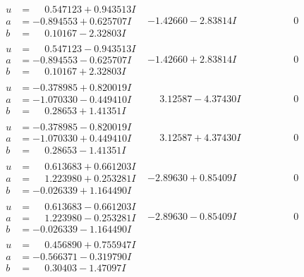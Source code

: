 \documentclass[1p]{elsarticle_modified}
\theoremstyle{definition}
\begin{document}
$$\begin{array}{c|c|c}
\begin{aligned}
u &= \phantom{-}0.547123 + 0.943513 I \\
a &= -0.894553 + 0.625707 I \\
b &= \phantom{-}0.10167 - 2.32803 I\end{aligned}
 & -1.42660 - 2.83814 I & \phantom{-0.000000 } 0 \\ \hline\begin{aligned}
u &= \phantom{-}0.547123 - 0.943513 I \\
a &= -0.894553 - 0.625707 I \\
b &= \phantom{-}0.10167 + 2.32803 I\end{aligned}
 & -1.42660 + 2.83814 I & \phantom{-0.000000 } 0 \\ \hline\begin{aligned}
u &= -0.378985 + 0.820019 I \\
a &= -1.070330 - 0.449410 I \\
b &= \phantom{-}0.28653 + 1.41351 I\end{aligned}
 & \phantom{-}3.12587 - 4.37430 I & \phantom{-0.000000 } 0 \\ \hline\begin{aligned}
u &= -0.378985 - 0.820019 I \\
a &= -1.070330 + 0.449410 I \\
b &= \phantom{-}0.28653 - 1.41351 I\end{aligned}
 & \phantom{-}3.12587 + 4.37430 I & \phantom{-0.000000 } 0 \\ \hline\begin{aligned}
u &= \phantom{-}0.613683 + 0.661203 I \\
a &= \phantom{-}1.223980 + 0.253281 I \\
b &= -0.026339 + 1.164490 I\end{aligned}
 & -2.89630 + 0.85409 I & \phantom{-0.000000 } 0 \\ \hline\begin{aligned}
u &= \phantom{-}0.613683 - 0.661203 I \\
a &= \phantom{-}1.223980 - 0.253281 I \\
b &= -0.026339 - 1.164490 I\end{aligned}
 & -2.89630 - 0.85409 I & \phantom{-0.000000 } 0 \\ \hline\begin{aligned}
u &= \phantom{-}0.456890 + 0.755947 I \\
a &= -0.566371 - 0.319790 I \\
b &= \phantom{-}0.30403 - 1.47097 I\end{aligned}

\end{array}$$
\end{document}
